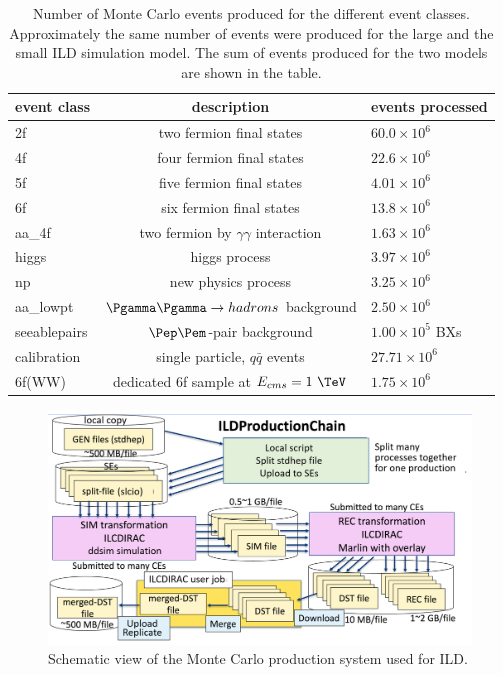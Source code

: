 \begin{table}[htbp]
\renewcommand{\arraystretch}{1.25}

\centering\small
\begin{tabular}{lcl}
\hline
 event class  &  description & events processed \\ 
\hline 
2f &   two fermion  final states &  $60.0 \times 10^6$ \\
4f &  four fermion final states & $22.6 \times 10^6$ \\
5f &  five fermion final states & $4.01 \times 10^6$ \\
6f &   six fermion  final states &  $13.8 \times 10^6$ \\
aa\_4f & two fermion by $\gamma\gamma$ interaction & $1.63 \times 10^6$ \\
higgs & higgs process & $3.97 \times 10^6$ \\
np & new physics process & $3.25 \times 10^6$ \\
\hline
aa\_lowpt &  $\Pgamma \Pgamma \to hadrons$ background  &  $2.50 \times 10^6$ \\
seeablepairs &   $\Pep\Pem$-pair background    &  $1.00\times 10^5$ BXs \\
calibration & single particle, $q\bar{q}$ events & $27.71\times 10^6$ \\
\hline
6f(WW) &  dedicated 6f sample at $E_{cms}=1~\TeV$ &  $1.75 \times 10^6$ \\

\hline
\end{tabular}
\caption{\label{tab:mcprod_evtnum} Number of Monte Carlo events produced for the different event classes. 
Approximately the same number of events were produced for the large and the small ILD simulation model.
The sum of events produced for the two models are shown in the table.} 
\end{table}



\begin{figure}[t!]
\includegraphics[width=1.0\hsize]{Modelling/fig/ilcdirac_ild_scheme.png}
\caption{\label{fig:sim_ild_mcprod} Schematic view of the Monte Carlo production system used for ILD.}
\end{figure}

